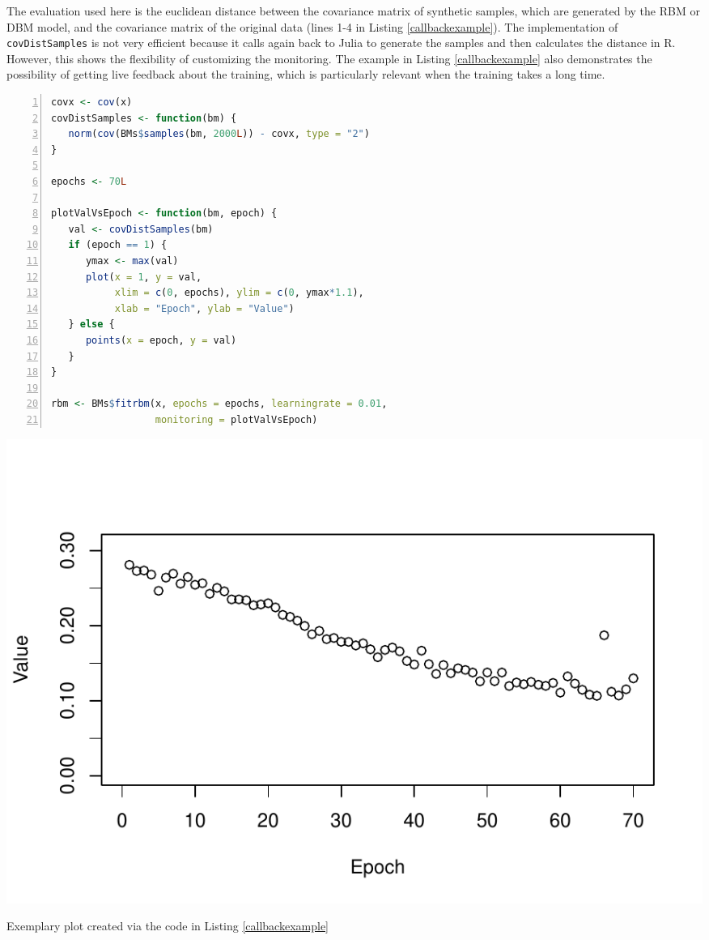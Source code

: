 \documentclass[12pt]{article}
\newcommand{\inlinecode}[1]{\texttt{#1}}
\begin{document}
The evaluation used here is the euclidean distance between the covariance matrix of synthetic samples, which are generated by the RBM or DBM model, and the covariance matrix of the original data (lines 1-4 in Listing \ref{callbackexample}).
The implementation of \inlinecode{covDistSamples} is not very efficient because it calls again back to Julia to generate the samples and then calculates the distance in R.
However, this shows the flexibility of customizing the monitoring.
The example in Listing \ref{callbackexample} also demonstrates the possibility of getting live feedback about the training, which is particularly relevant when the training takes a long time.

\noindent\begin{minipage}{\linewidth}
\captionsetup{type=listing}
\begin{lstlisting}[language=R, caption={Using an R function as a callback function during RBM training}, label={callbackexample}, numbers = left]
covx <- cov(x)
covDistSamples <- function(bm) {
   norm(cov(BMs$samples(bm, 2000L)) - covx, type = "2")
}

epochs <- 70L

plotValVsEpoch <- function(bm, epoch) {
   val <- covDistSamples(bm)
   if (epoch == 1) {
      ymax <- max(val)
      plot(x = 1, y = val,
           xlim = c(0, epochs), ylim = c(0, ymax*1.1),
           xlab = "Epoch", ylab = "Value")
   } else {
      points(x = epoch, y = val)
   }
}

rbm <- BMs$fitrbm(x, epochs = epochs, learningrate = 0.01,
                  monitoring = plotValVsEpoch)
\end{lstlisting}

\captionsetup{type=figure}
   \centering
   \includegraphics[scale=.95,trim={0cm 0.5cm 0cm 0cm}]{images/callbackplot.pdf}
   \caption{Exemplary plot created via the code in Listing \ref{callbackexample}}
\label{fig:callbackplot}
\end{minipage}
\clearpage
\end{document}
